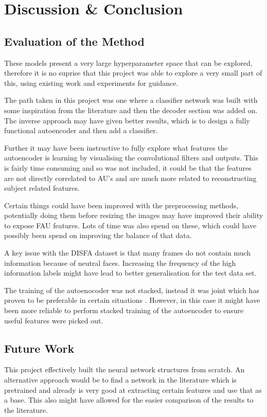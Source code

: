 \chapter{Discussion \& Conclusion}

  \section{Evaluation of the Method}
    These models present a very large hyperparameter space that can be explored, therefore
    it is no suprise that this project was able to explore a very small part of this, using
    existing work and experiments for guidance.

    The path taken in this project was one where a classifier network was built
    with some inspiration from the literature and then the decoder section was added on.
    The inverse approach may have given better results, which is to design a fully functional
    autoencoder and then add a classifier.

    Further it may have been instructive to fully explore what features the autoencoder is learning
    by visualising the convolutional filters and outputs. This is fairly time consuming and
    so was not included, it could be that the features are not directly correlated to AU's and
    are much more related to reconstructing subject related features.

    Certain things could have been improved with the preprocessing methods,
    potentially doing them before resizing the images may have improved their
    ability to expose FAU features. Lots of time was also spend on these, which could have
    possibly been spend on improving the balance of that data.

    A key issue with the DISFA dataset is that many frames do not contain much information
    because of neutral faces. Increasing the frequency of the high information labels
    might have lead to better generalisation for the test data set.

    The training of the autoenocoder was not stacked, instead it was joint which has
    proven to be preferable in certain situations \cite{Zhou2014}. However, in this case
    it might have been more reliable to perform stacked training of the autoencoder to ensure
    useful features were picked out.

  \section{Future Work}
    This project effectively built the neural network structures from scratch.
    An alternative approach would be to find a network in the literature which is pretrained
    and already is very good at extracting certain features and use that as a base.
    This also might have allowed for the easier comparison of the results to the literature.

